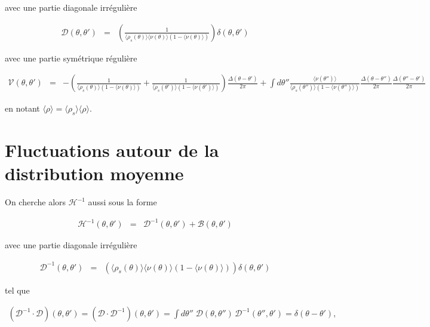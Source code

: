 avec une partie diagonale irrégulière

\begin{eqnarray}
	\mathcal{D}(\theta, \theta') & = & \left ( \frac{1}{\langle \rho_s(\theta) \rangle \langle \nu(\theta) \rangle (1 - \langle \nu(\theta) \rangle) }\right )  \delta(\theta, \theta') 	
\end{eqnarray}

avec une partie symétrique régulière

\begin{eqnarray}
	\mathcal{V}(\theta, \theta')	 & = & - \left ( \frac{1}{\langle \rho_s(\theta) \rangle (1 - \langle \nu(\theta) \rangle) } + \frac{1}{\langle \rho_s(\theta') \rangle  (1 - \langle \nu(\theta') \rangle) }\right )\frac{\Delta(\theta - \theta')}{2\pi} + \int d \theta''  \frac{\langle \nu(\theta'') \rangle}{\langle \rho_s(\theta'') \rangle (1 - \langle \nu(\theta'') \rangle) } \frac{\Delta(\theta - \theta'' )}{2\pi} \frac{\Delta(\theta''  - \theta')}{2\pi}
	\label{chap:fluctu:eq:reg}
\end{eqnarray}
 
 en notant $\langle \rho \rangle = \langle \rho_s \rangle \langle \rho \rangle$.\\
 
 \section{Fluctuations autour de la distribution moyenne}
 
 On cherche alors \( \mathcal{H}^{-1} \) aussi sous la forme 

\begin{eqnarray}
	\mathcal{H}^{-1}(\theta, \theta') & = & \mathcal{D}^{-1}(\theta, \theta') + \mathcal{B}(\theta, \theta') 
	\label{chap:fluctu:eq:hessienner.inv.1}	
\end{eqnarray}

avec une partie diagonale irrégulière

\begin{eqnarray}
	\mathcal{D}^{-1}(\theta, \theta') & = & (\langle \rho_s(\theta) \rangle \langle \nu(\theta) \rangle (1 - \langle \nu(\theta) \rangle))  \delta(\theta, \theta') 
	 \label{chap:fluctu:eq:irreg.inv}	
\end{eqnarray}

tel que 

\begin{eqnarray}
    (\mathcal{D}^{-1} \cdot  \mathcal{D})(\theta, \theta')  = (\mathcal{D}\cdot  \mathcal{D}^{-1})(\theta, \theta') =  \int d\theta'' \; \mathcal{D}(\theta, \theta'') \, \mathcal{D}^{-1}(\theta'', \theta') = \delta(\theta - \theta'),
    \label{chap:fluctu:eq:irreg.prod.inv}
\end{eqnarray}


